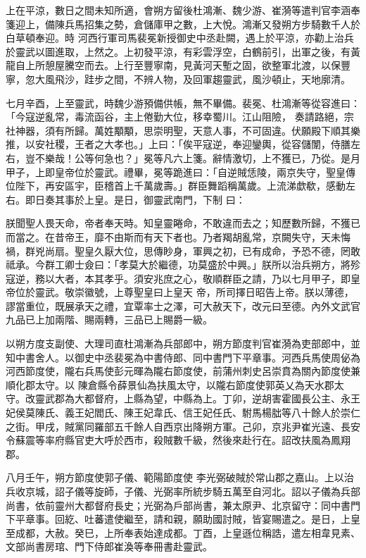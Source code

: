 \begin{pinyinscope}
 上在平涼，數日之間未知所適，會朔方留後杜鴻漸、魏少游、崔漪等遣判官李涵奉箋迎上，備陳兵馬招集之勢，倉儲庫甲之數，上大悅。鴻漸又發朔方步騎數千人於白草頓奉迎。時
 河西行軍司馬裴冕新授御史中丞赴闕，遇上於平涼，亦勸上治兵於靈武以圖進取，上然之。上初發平涼，有彩雲浮空，白鶴前引，出軍之後，有黃龍自上所憩屋騰空而去。上行至豐寧南，見黃河天塹之固，欲整軍北渡，以保豐寧，忽大風飛沙，跬步之間，不辨人物，及回軍趨靈武，風沙頓止，天地廓清。



 七月辛酉，上至靈武，時魏少游預備供帳，無不畢備。裴冕、杜鴻漸等從容進曰：「今寇逆亂常，毒流函谷，主上倦勤大位，移幸蜀川。江山阻險，
 奏請路絕，宗社神器，須有所歸。萬姓顒顒，思崇明聖，天意人事，不可固違。伏願殿下順其樂推，以安社稷，王者之大孝也。」上曰：「俟平寇逆，奉迎鑾輿，從容儲闈，侍膳左右，豈不樂哉！公等何急也？」冕等凡六上箋。辭情激切，上不獲已，乃從。是月甲子，上即皇帝位於靈武。禮畢，冕等跪進曰：「自逆賊恁陵，兩京失守，聖皇傳位陛下，再安區宇，臣稽首上千萬歲壽。」群臣舞蹈稱萬歲。上流涕歔欷，感動左右。即日奏其事於上皇。是日，御靈武南門，下制
 曰：



 朕聞聖人畏天命，帝者奉天時。知皇靈睠命，不敢違而去之；知歷數所歸，不獲已而當之。在昔帝王，靡不由斯而有天下者也。乃者羯胡亂常，京闕失守，天未悔禍，群兇尚扇。聖皇久厭大位，思傳眇身，軍興之初，已有成命，予恐不德，罔敢祗承。今群工卿士僉曰：「孝莫大於繼德，功莫盛於中興。」朕所以治兵朔方，將殄寇逆，務以大者，本其孝乎。須安兆庶之心，敬順群臣之請，乃以七月甲子，即皇帝位於靈武。敬崇徽號，上尊聖皇曰上皇天
 帝，所司擇日昭告上帝。朕以薄德，謬當重位，既展承天之禮，宜覃率士之澤，可大赦天下，改元曰至德。內外文武官九品已上加兩階、賜兩轉，三品已上賜爵一級。



 以朔方度支副使、大理司直杜鴻漸為兵部郎中，朔方節度判官崔漪為吏部郎中，並知中書舍人。以御史中丞裴冕為中書侍郎、同中書門下平章事。河西兵馬使周佖為河西節度使，隴右兵馬使彭元暉為隴右節度使，前蒲州刺史呂崇賁為關內節度使兼順化郡太守。以
 陳倉縣令薛景仙為扶風太守，以隴右節度使郭英乂為天水郡太守。改靈武郡為大都督府，上縣為望，中縣為上。丁卯，逆胡害霍國長公主、永王妃侯莫陳氏、義王妃閻氏、陳王妃韋氏、信王妃任氏、駙馬楊朏等八十餘人於崇仁之街。甲戌，賊黨同羅部五千餘人自西京出降朔方軍。己卯，京兆尹崔光遠、長安令蘇震等率府縣官吏大呼於西市，殺賊數千級，然後來赴行在。詔改扶風為鳳翔郡。



 八月壬午，朔方節度使郭子儀、範陽節度使
 李光弼破賊於常山郡之嘉山。上以治兵收京城，詔子儀等旋師，子儀、光弼率所統步騎五萬至自河北。詔以子儀為兵部尚書，依前靈州大都督府長史；光弼為戶部尚書，兼太原尹、北京留守：同中書門下平章事。回紇、吐蕃遣使繼至，請和親，願助國討賊，皆宴賜遣之。是日，上皇至成都，大赦。癸巳，上所奉表始達成都。丁酉，上皇遜位稱誥，遣左相韋見素、文部尚書房琯、門下侍郎崔渙等奉冊書赴靈武。




\end{pinyinscope}
